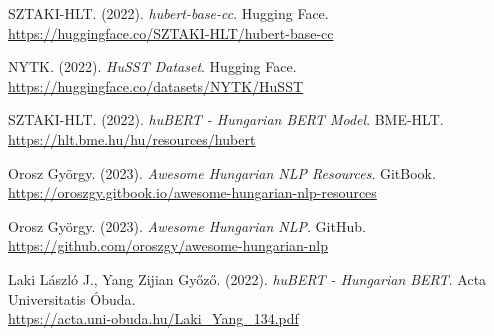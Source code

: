\documentclass[12pt]{article}
\begin{document}
\begin{thebibliography}{9}

SZTAKI-HLT. (2022). \textit{hubert-base-cc}. Hugging Face. \\
\url{https://huggingface.co/SZTAKI-HLT/hubert-base-cc}

NYTK. (2022). \textit{HuSST Dataset}. Hugging Face. \\
\url{https://huggingface.co/datasets/NYTK/HuSST}

SZTAKI-HLT. (2022). \textit{huBERT - Hungarian BERT Model}. BME-HLT. \\
\url{https://hlt.bme.hu/hu/resources/hubert}

Orosz György. (2023). \textit{Awesome Hungarian NLP Resources}. GitBook. \\
\url{https://oroszgy.gitbook.io/awesome-hungarian-nlp-resources}

Orosz György. (2023). \textit{Awesome Hungarian NLP}. GitHub. \\
\url{https://github.com/oroszgy/awesome-hungarian-nlp}

Laki László J., Yang Zijian Győző. (2022). \textit{huBERT - Hungarian BERT}. Acta Universitatis Óbuda. \\
\url{https://acta.uni-obuda.hu/Laki_Yang_134.pdf}

\end{thebibliography}
\end{document}
